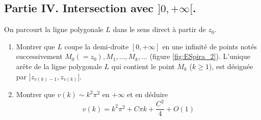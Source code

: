 \subsection*{Partie IV. Intersection avec $]0,+\infty[$.}
On parcourt la ligne polygonale $L$ dans le sens direct {\`a} partir de $z_0$.
\begin{enumerate}
\item Montrer que $L$ coupe la demi-droite $[0,+\infty]$ en une infinit{\'e} de points notés successivement $M_0(=z_0),M_1,\ldots,M_k,\ldots$ (figure \ref{fig:ESpira_2}). \newline
L'unique ar{\^e}te de la ligne polygonale $L$ qui contient le point $M_k$ ($k\geq 1$), est d{\'e}sign{\'e}e par $]z_{v(k)-1},z_{v(k)}]$.
\item Montrer que $v(k)\sim k^2 \pi^2$ en $+\infty$ et en déduire
\begin{displaymath}
v(k)=k^2\pi^2 + C\pi k + \frac{C^2}{4} + O(1)  
\end{displaymath}
\end{enumerate}
